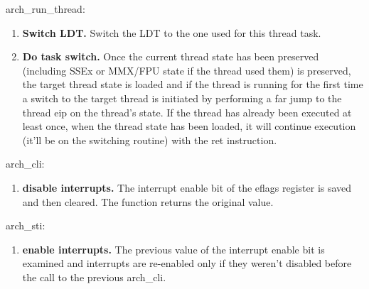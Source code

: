 \documentclass[11pt, letterpaper, twoside, english]{book}
\begin{document}
\textsf{arch\_run\_thread}: 
\begin{enumerate}
\item[]\textbf{Switch LDT.} Switch the LDT to the one used for this thread task.
\item[]\textbf{Do task switch.} Once the current thread state has been preserved (including SSEx or MMX/FPU state if the thread used them) is preserved, the target thread state is loaded and if the thread is running for the first time a switch to the target thread is initiated by performing a far jump to the thread eip on the thread's state. If the thread has already been executed at least once, when the thread state has been loaded, it will continue execution (it'll be on the switching routine) with the ret instruction.
\end{enumerate}

\textsf{arch\_cli}:
\begin{enumerate}
\item[]\textbf{disable interrupts.} The interrupt enable bit of the eflags register is saved and then cleared. The function returns the original value.
\end{enumerate}

\textsf{arch\_sti}:
\begin{enumerate}
\item[]\textbf{enable interrupts.} The previous value of the interrupt enable bit is examined and interrupts are re-enabled only if they weren't disabled before the call to the previous \textsf{arch\_cli}.
\end{enumerate}
\end{document}
